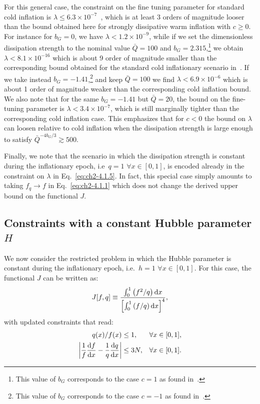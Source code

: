 For this general case, the constraint on the fine tuning parameter for standard cold inflation is $\lambda\leq 6.3\times 10^{-7}$~\citep{Adams:1990pn}, which is at least 3 orders of magnitude looser than the bound obtained here for strongly dissipative warm inflation with $c\geq 0$. For instance for $b_G=0$, we have $\lambda<1.2\times 10^{-9}$, while if we set the dimensionless dissipation strength to the nominal value $\bar{Q}=100$ and $b_G=2.315$,\footnote{This value of $b_G$ corresponds to the case $c=1$ as found in~\citep{Bastero-Gil:2016qru,Benetti:2016jhf}.} we obtain $\lambda<8.1\times 10^{-16}$ which is about 9 order of magnitude smaller than the corresponding bound obtained for the standard cold inflationary scenario in~\citep{Adams:1990pn}. If we take instead $b_G=-1.41$,\footnote{This value of $b_G$ corresponds to the case $c=-1$ as found in~\citep{Motaharfar:2018zyb}.} and keep $\bar{Q}=100$ we find $\lambda<6.9\times 10^{-6}$ which is about 1 order of magnitude weaker than the corresponding cold inflation bound. We also note that for the same $b_G=-1.41$ but $\bar{Q}=20$, the bound on the fine-tuning parameter is $\lambda<3.4\times 10^{-7}$, which is still marginally tighter than the corresponding cold inflation case. This emphasizes that for $c<0$ the bound on $\lambda$ can loosen relative to cold inflation when the dissipation strength is large enough to satisfy $\bar{Q}^{-4 b_G/3}\gtrsim 500$.

Finally, we note that the scenario in which the dissipation strength is constant during the inflationary epoch, i.e\ $q=1$ $\forall x\in[0,1]$, is encoded already in the constraint on $\lambda$ in Eq.~\ref{eq:ch2-4.1.5}. In fact, this special case simply amounts to taking $f_q\rightarrow f$ in Eq.~\ref{eq:ch2-4.1.1} which does not change the derived upper bound on the functional $J$.

\subsection{Constraints with a constant Hubble parameter $H$}
\label{sec:ch2-4.2}

We now consider the restricted problem in which the Hubble parameter is constant during the inflationary epoch, i.e.\ $h=1$ $\forall x\in[0,1]$. For this case, the functional $J$ can be written as:
\begin{equation}
    J[f,q] \equiv \frac{\int_{0}^{1}\left (f^{2}/q\right) {\rm d} x}{\left[\int_{0}^{1}\left(f/q \right)  {\rm d} x\right]^{4}}, \label{eq:ch2-4.2.1}
\end{equation}
with updated constraints that read:
\begin{align}
    q(x)/f(x)&\leq 1, & \forall x \in[0,1], \label{eq:ch2-4.2.2}\\
\left|\frac{1}{f} \frac{{\rm d} f}{{\rm d} x} -\frac{1}{q}\frac{{\rm d}q}{{\rm d}x}\right| &\leq 3 N, & \forall x \in[0,1]. \label{eq:ch2-4.2.3}
\end{align}

